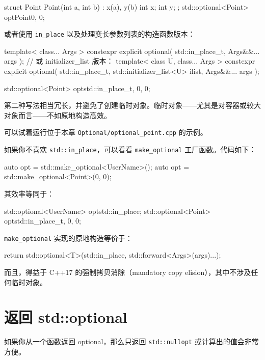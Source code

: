 \begin{codebox}[cpp]
struct Point
{
Point(int a, int b) : x(a), y(b) { }
int x;
int y;
};
std::optional<Point> opt{Point{0, 0}};
\end{codebox}

或者使用 \texttt{in\_place} 以及处理变长参数列表的构造函数版本：

\begin{codebox}[cpp]
template< class... Args >
constexpr explicit optional( std::in_place_t, Args&&... args );
// 或 initializer_list 版本：
template< class U, class... Args >
constexpr explicit optional( std::in_place_t,
std::initializer_list<U> ilist,
Args&&... args );
\end{codebox}

\begin{codebox}[cpp]
std::optional<Point> opt{std::in_place_t, 0, 0};
\end{codebox}

第二种写法相当冗长，并避免了创建临时对象。临时对象——尤其是对容器或较大对象而言——不如原地构造高效。

可以试着运行位于本章 \texttt{Optional/optional\_point.cpp} 的示例。

如果你不喜欢 \texttt{std::in\_place}，可以看看 \texttt{make\_optional} 工厂函数。代码如下：

\begin{codebox}[cpp]
auto opt = std::make_optional<UserName>();
auto opt = std::make_optional<Point>(0, 0);
\end{codebox}

其效率等同于：

\begin{codebox}[cpp]
std::optional<UserName> opt{std::in_place};
std::optional<Point> opt{std::in_place_t, 0, 0};
\end{codebox}

\texttt{make\_optional} 实现的原地构造等价于：

\begin{codebox}[cpp]
return std::optional<T>(std::in_place, std::forward<Args>(args)...);
\end{codebox}

而且，得益于 C++17 的强制拷贝消除（mandatory copy elision），其中不涉及任何临时对象。

\section{返回 std::optional}
如果你从一个函数返回 optional，那么只返回 \texttt{std::nullopt} 或计算出的值会非常方便。

